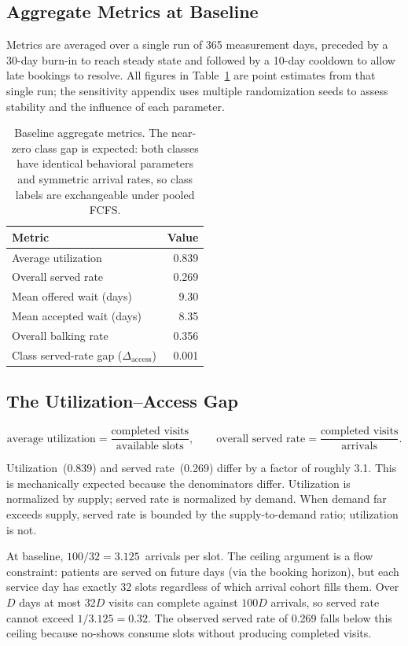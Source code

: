 \documentclass[11pt]{article}
\begin{document}
\subsection{Aggregate Metrics at Baseline}

Metrics are averaged over a single run of 365 measurement days,
preceded by a 30-day burn-in to reach steady state and followed by a
10-day cooldown to allow late bookings to resolve. All figures in
Table~\ref{tab:baseline} are point estimates from that single run; the
sensitivity appendix uses multiple randomization seeds to assess stability and the influence of each parameter.

\begin{table}[H]
\centering
\renewcommand{\arraystretch}{1.15}
\begin{tabular}{lr}
\toprule
Metric & Value \\
\midrule
Average utilization & 0.839 \\
Overall served rate & 0.269 \\
Mean offered wait (days) & 9.30 \\
Mean accepted wait (days) & 8.35 \\
Overall balking rate & 0.356 \\
Class served-rate gap ($\Delta_{\text{access}}$) & 0.001 \\
\bottomrule
\end{tabular}
\caption{Baseline aggregate metrics. The near-zero class gap is expected:
both classes have identical behavioral parameters and symmetric arrival rates,
so class labels are exchangeable under pooled FCFS.}
\label{tab:baseline}
\end{table}

\subsection{The Utilization--Access Gap}

\[
  \text{average utilization}
  = \frac{\text{completed visits}}{\text{available slots}},
  \qquad
  \text{overall served rate}
  = \frac{\text{completed visits}}{\text{arrivals}}.
\]

Utilization~(0.839) and served rate~(0.269) differ by a factor of roughly
3.1. This is mechanically expected because the denominators differ.
Utilization is normalized by supply; served rate is normalized by demand.
When demand far exceeds supply, served rate is bounded by the
supply-to-demand ratio; utilization is not.

At baseline, $100/32 = 3.125$~arrivals per slot. The ceiling argument is
a flow constraint: patients are served on future days (via the booking
horizon), but each service day has exactly 32 slots regardless of which
arrival cohort fills them. Over $D$ days at most $32D$ visits can complete
against $100D$ arrivals, so served rate cannot exceed $1/3.125 = 0.32$.
The observed served rate of 0.269 falls below this ceiling because
no-shows consume slots without producing completed visits.
\end{document}
